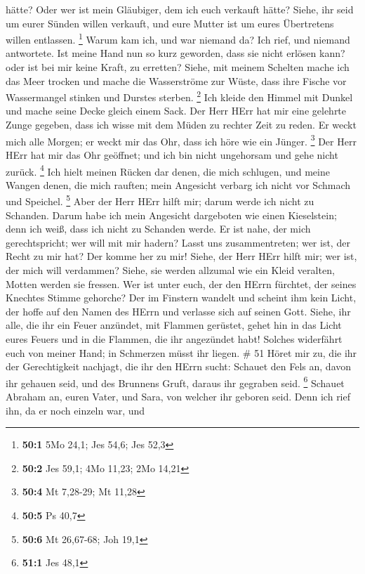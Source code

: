 hätte? Oder wer ist mein Gläubiger, dem ich euch verkauft hätte? Siehe,
ihr seid um eurer Sünden willen verkauft, und eure Mutter ist um eures
Übertretens willen entlassen. \footnote{\textbf{50:1} 5Mo 24,1; Jes
  54,6; Jes 52,3}  Warum kam ich, und war niemand da? Ich
rief, und niemand antwortete. Ist meine Hand nun so kurz geworden, dass
sie nicht erlösen kann? oder ist bei mir keine Kraft, zu erretten?
Siehe, mit meinem Schelten mache ich das Meer trocken und mache die
Wasserströme zur Wüste, dass ihre Fische vor Wassermangel stinken und
Durstes sterben. \footnote{\textbf{50:2} Jes 59,1; 4Mo 11,23; 2Mo 14,21}
 Ich kleide den Himmel mit Dunkel und mache seine Decke
gleich einem Sack.  Der Herr HErr hat mir eine gelehrte
Zunge gegeben, dass ich wisse mit dem Müden zu rechter Zeit zu reden. Er
weckt mich alle Morgen; er weckt mir das Ohr, dass ich höre wie ein
Jünger. \footnote{\textbf{50:4} Mt 7,28-29; Mt 11,28}  Der
Herr HErr hat mir das Ohr geöffnet; und ich bin nicht ungehorsam und
gehe nicht zurück. \footnote{\textbf{50:5} Ps 40,7}  Ich
hielt meinen Rücken dar denen, die mich schlugen, und meine Wangen
denen, die mich rauften; mein Angesicht verbarg ich nicht vor Schmach
und Speichel. \footnote{\textbf{50:6} Mt 26,67-68; Joh 19,1}
 Aber der Herr HErr hilft mir; darum werde ich nicht zu
Schanden. Darum habe ich mein Angesicht dargeboten wie einen
Kieselstein; denn ich weiß, dass ich nicht zu Schanden werde.
 Er ist nahe, der mich gerechtspricht; wer will mit mir
hadern? Lasst uns zusammentreten; wer ist, der Recht zu mir hat? Der
komme her zu mir!  Siehe, der Herr HErr hilft mir; wer ist,
der mich will verdammen? Siehe, sie werden allzumal wie ein Kleid
veralten, Motten werden sie fressen.  Wer ist unter euch,
der den HErrn fürchtet, der seines Knechtes Stimme gehorche? Der im
Finstern wandelt und scheint ihm kein Licht, der hoffe auf den Namen des
HErrn und verlasse sich auf seinen Gott.  Siehe, ihr alle,
die ihr ein Feuer anzündet, mit Flammen gerüstet, gehet hin in das Licht
eures Feuers und in die Flammen, die ihr angezündet habt! Solches
widerfährt euch von meiner Hand; in Schmerzen müsst ihr liegen. \# 51
 Höret mir zu, die ihr der Gerechtigkeit nachjagt, die ihr
den HErrn sucht: Schauet den Fels an, davon ihr gehauen seid, und des
Brunnens Gruft, daraus ihr gegraben seid. \footnote{\textbf{51:1} Jes
  48,1}  Schauet Abraham an, euren Vater, und Sara, von
welcher ihr geboren seid. Denn ich rief ihn, da er noch einzeln war, und

